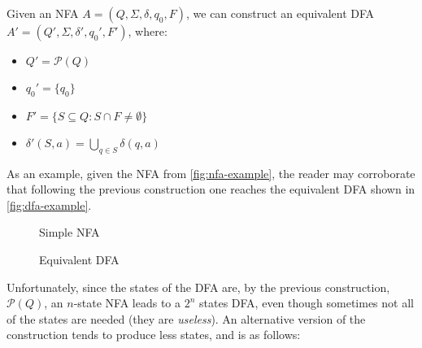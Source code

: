 \documentclass{article}
\theoremstyle{definition}
\begin{document}
Given an NFA $A = (Q,\Sigma, \delta,q_0,F)$, we can construct an equivalent DFA $A' = (Q', \Sigma, \delta', q_0', F')$, where:
\begin{itemize}
\item $Q' = \mathcal{P}(Q)$
\item $q_0' = \{q_0\}$
\item $F' = \{S \subseteq Q: S\cap F \neq \emptyset \}$
\item $\delta'(S,a) = \bigcup\limits_{q \in S} \delta(q,a)$
\end{itemize}

As an example, given the NFA from \autoref{fig:nfa-example}, the reader may
corroborate that following the previous construction one reaches the equivalent
DFA shown in \autoref{fig:dfa-example}.

\begin{figure}[htp]
  \centering
{}
\caption{\label{fig:nfa-example} Simple NFA}
\end{figure}

\begin{figure}[htp]
  \centering
{}
\caption{\label{fig:dfa-example} Equivalent DFA}
\end{figure}

Unfortunately, since the states of the DFA are, by the previous construction,
$\mathcal{P}(Q)$, an $n$-state NFA leads to a $2^n$ states DFA, even though
sometimes not all of the states are needed (they are \textit{useless}). An
alternative version of the construction tends to produce less states, and is as
follows: 
\end{document}
